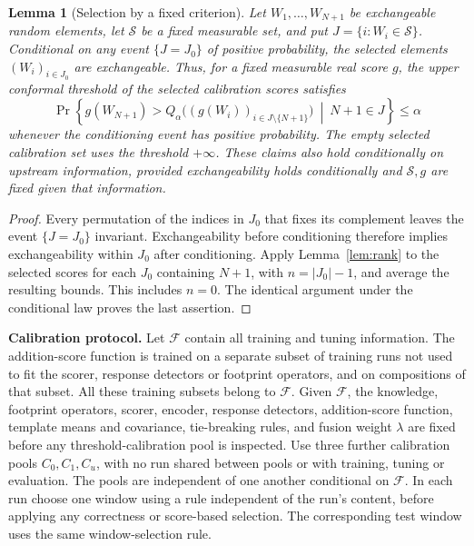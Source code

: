 \documentclass[10pt]{article}
\theoremstyle{plain}
\newtheorem{lemma}{Lemma}
\theoremstyle{remark}
\begin{document}
\begin{lemma}[Selection by a fixed criterion]
\label{lem:select}
Let $W_1,\ldots,W_{N+1}$ be exchangeable random elements, let $\mathcal S$ be a fixed measurable set, and put $J=\{i:W_i\in\mathcal S\}$. Conditional on any event $\{J=J_0\}$ of positive probability, the selected elements $(W_i)_{i\in J_0}$ are exchangeable. Thus, for a fixed measurable real score $g$, the upper conformal threshold of the selected calibration scores satisfies
\[
 \Pr\!\left\{g(W_{N+1})>Q_\alpha\bigl((g(W_i))_{i\in J\setminus\{N+1\}}\bigr)
 \ \middle|\ N+1\in J\right\}\le\alpha
\]
whenever the conditioning event has positive probability. The empty selected calibration set uses the threshold $+\infty$. These claims also hold conditionally on upstream information, provided exchangeability holds conditionally and $\mathcal S,g$ are fixed given that information.
\end{lemma}

\begin{proof}
Every permutation of the indices in $J_0$ that fixes its complement leaves the event $\{J=J_0\}$ invariant. Exchangeability before conditioning therefore implies exchangeability within $J_0$ after conditioning. Apply Lemma~\ref{lem:rank} to the selected scores for each $J_0$ containing $N+1$, with $n=\lvert J_0\rvert-1$, and average the resulting bounds. This includes $n=0$. The identical argument under the conditional law proves the last assertion.
\end{proof}

\textbf{Calibration protocol.}
Let $\mathcal F$ contain all training and tuning information. The addition-score function is trained on a separate subset of training runs not used to fit the scorer, response detectors or footprint operators, and on compositions of that subset. All these training subsets belong to $\mathcal F$. Given $\mathcal F$, the knowledge, footprint operators, scorer, encoder, response detectors, addition-score function, template means and covariance, tie-breaking rules, and fusion weight $\lambda$ are fixed before any threshold-calibration pool is inspected. Use three further calibration pools $C_0,C_1,C_u$, with no run shared between pools or with training, tuning or evaluation. The pools are independent of one another conditional on $\mathcal F$. In each run choose one window using a rule independent of the run's content, before applying any correctness or score-based selection. The corresponding test window uses the same window-selection rule.
\end{document}

